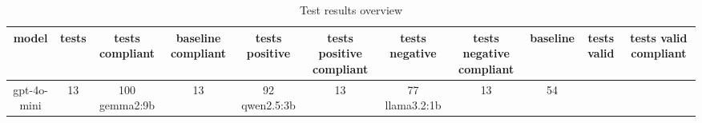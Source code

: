 
  \begin{table}[h!]
  \centering
  \begin{tabular}{|c|c|c|c|c|c|c|c|c|c|c|}
  \hline
  model & tests & tests compliant & baseline compliant & tests positive & tests positive compliant & tests negative & tests negative compliant & baseline & tests valid & tests valid compliant \\
  \hline
  gpt-4o-mini & 13 & 100%
\hline
gemma2:9b & 13 & 92%
\hline
qwen2.5:3b & 13 & 77%
\hline
llama3.2:1b & 13 & 54%
  \end{tabular}
  \caption{Test results overview}
  
  \end{table}
  